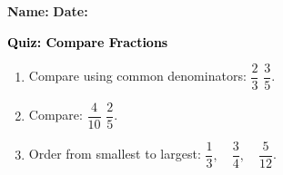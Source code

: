 \documentclass[12pt, letterpaper, fleqn]{article}
\newcommand{\blank}{\underline{\hspace{2.2cm}}}
\begin{document}
\textbf{Name:} \underline{\hspace{5cm}}
\hfill
\textbf{Date:} \underline{\hspace{3cm}}\\

\begin{tcolorbox}[colback=customteal!20]
    \large\textcolor{black}{\textbf{Quiz: Compare Fractions}}
\end{tcolorbox}
\begin{enumerate}[itemsep=3.5cm, leftmargin=0.6cm]
\item Compare using common denominators: $\dfrac{2}{3}$ \blank $\dfrac{3}{5}$.
\vspace{3.5cm}
\item Compare: $\dfrac{4}{10}$ \blank $\dfrac{2}{5}$.
\vspace{3.5cm}
\item Order from smallest to largest: $\dfrac{1}{3}, \quad \dfrac{3}{4}, \quad \dfrac{5}{12}$.
\end{enumerate}
\end{document}

